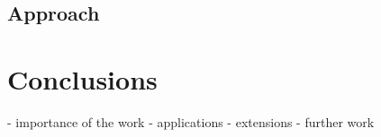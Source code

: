 \documentclass[12pt,a4paper]{article}
\begin{document}
    \subsection{Approach}

\section{Conclusions}

    - importance of the work
    - applications
    - extensions
    - further work
    

\end{document}
